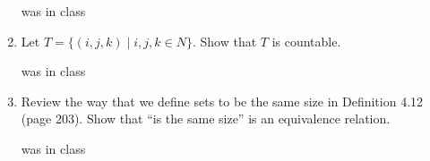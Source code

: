 \documentclass{article}
\begin{document}
\begin{enumerate}
        was in class
        \item Let $T = \{(i,j,k) \mid i,j,k \in N\}$. Show that $T$ is countable.\newline

        was in class
        \item Review the way that we define sets to be the same size in Definition 4.12 (page 203).
        Show that “is the same size” is an equivalence relation.\newline

        was in class
    \end{enumerate}
\end{document}
